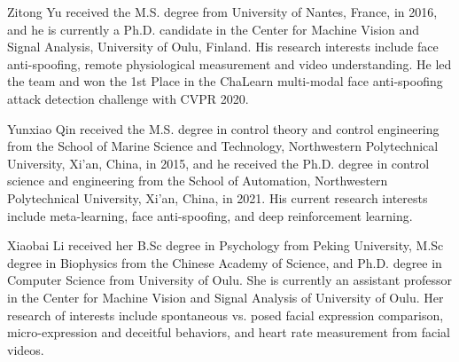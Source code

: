 \documentclass[10pt,journal,compsoc]{IEEEtran}
\begin{document}
\begin{IEEEbiography}{Zitong Yu}
 received the M.S. degree from University of Nantes, France, in 2016, and he is currently a Ph.D. candidate in the Center for Machine Vision and Signal Analysis, University of Oulu, Finland. His research interests include face anti-spoofing, remote physiological measurement and video understanding. He led the team and won the 1st Place in the ChaLearn multi-modal face anti-spoofing attack detection challenge with CVPR 2020.
\end{IEEEbiography}





\begin{IEEEbiography}{Yunxiao Qin} received the M.S. degree in control theory and control engineering from the School of Marine Science and Technology, Northwestern Polytechnical University, Xi’an, China, in 2015, and he received the Ph.D. degree in control science and engineering from the School of Automation, Northwestern Polytechnical University, Xi’an, China, in 2021. His current research interests include meta-learning, face anti-spoofing, and deep reinforcement learning.
	\end{IEEEbiography}



\begin{IEEEbiography}{Xiaobai Li}
received her B.Sc degree in Psychology from Peking University, M.Sc degree in Biophysics from the Chinese Academy of Science, and Ph.D. degree in Computer Science from University of Oulu. She is currently an assistant professor in the Center for Machine Vision and Signal Analysis of University of Oulu. Her research of interests include spontaneous vs. posed facial expression comparison, micro-expression and deceitful behaviors, and heart rate measurement from facial videos. 
\end{IEEEbiography}
\end{document}
